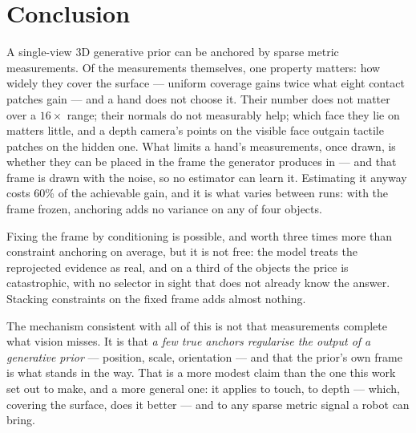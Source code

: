 \documentclass[conference]{IEEEtran}
\begin{document}
\section{Conclusion}

A single-view 3D generative prior can be anchored by sparse metric measurements. Of
the measurements themselves, one property matters: how widely they cover the surface
--- uniform coverage gains twice what eight contact patches gain --- and a hand does not
choose it. Their number does not matter over a $16\times$ range; their normals do not
measurably help; which face they lie on matters little, and a depth camera's points on
the visible face outgain tactile patches on the hidden one. What limits a hand's
measurements, once drawn, is whether they can be placed in the frame the generator
produces in --- and that frame is drawn with the noise, so no estimator can learn it.
Estimating it anyway costs 60\% of the achievable gain, and it is what varies between runs: with the frame frozen, anchoring adds no variance on any of four objects.

Fixing the frame by conditioning is possible, and worth three times more than
constraint anchoring on average, but it is not free: the model treats the reprojected
evidence as real, and on a third of the objects the price is catastrophic, with no
selector in sight that does not already know the answer. Stacking constraints on the
fixed frame adds almost nothing.

The mechanism consistent with all of this is not that measurements complete what
vision misses. It is that \emph{a few true anchors regularise the output of a
generative prior} --- position, scale, orientation --- and that the prior's own frame
is what stands in the way. That is a more modest claim than the one this work set out
to make, and a more general one: it applies to touch, to depth --- which, covering the
surface, does it better --- and to any sparse metric signal a robot can bring.
\end{document}
